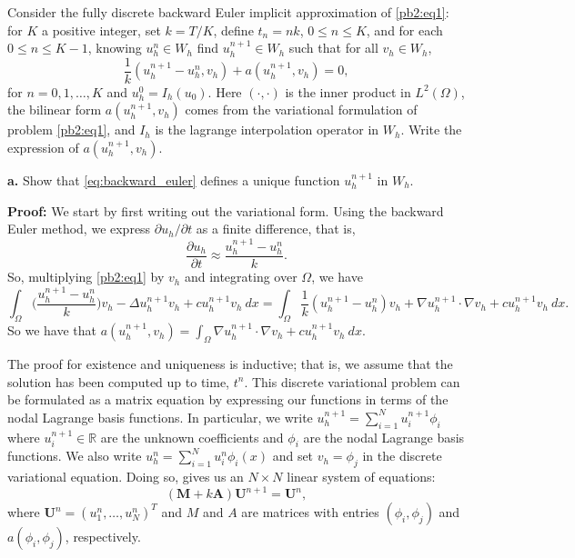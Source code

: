 \documentclass[11pt]{article}
\begin{document}
Consider the fully discrete backward Euler implicit approximation of \eqref{pb2:eq1}: for $K$ a positive integer, set $k = T/K$, define $t_n = nk$, $0 \leq n \leq K$, and for each $0 \leq n \leq K-1$, knowing $u_h^n \in W_h$ find $u_h^{n+1} \in W_h$ such that for all $v_h \in W_h$,
\begin{equation} \label{eq:backward_euler}
    \frac{1}{k}(u_h^{n+1} - u_h^n, v_h) + a(u_h^{n+1},v_h) = 0, 
\end{equation}
for $n = 0, 1, \ldots, K$ and $u_h^0 = I_h(u_0)$.
Here $(\cdot, \cdot)$ is the inner product in $L^2(\Omega)$, the bilinear form $a(u_h^{n+1}, v_h)$ comes from the variational formulation of problem \eqref{pb2:eq1}, and $I_h$ is the lagrange interpolation operator in $W_h$.
Write the expression of $a(u_h^{n+1}, v_h)$.

\vskip 1cm


\textbf{a.} Show that \eqref{eq:backward_euler} defines a unique function $u_h^{n+1}$ in $W_h$.

\vskip 1cm


\textbf{Proof:} We start by first writing out the variational form.
Using the backward Euler method, we express $\partial u_h/\partial t$ as a finite difference, that is,
\begin{equation}
    \frac{\partial u_h}{\partial t} \approx \frac{u_h^{n+1} - u_h^n}{k}.
\end{equation}
So, multiplying \eqref{pb2:eq1} by $v_h$ and integrating over $\Omega$, we have 
\begin{equation*}
    \int_\Omega \Big( \frac{u_h^{n+1} - u_h^n}{k} \Big) v_h  -\Delta u_h^{n+1} v_h + c u_h^{n+1} v_h \: dx = \int_\Omega \frac{1}{k}(u_h^{n+1} - u_h^n) v_h + \nabla u_h^{n+1} \cdot \nabla v_h + c u_h^{n+1} v_h \: dx.
\end{equation*}
So we have that $a(u_h^{n+1}, v_h) = \int_\Omega \nabla u_h^{n+1} \cdot \nabla v_h + c u_h^{n+1} v_h \: dx$.

The proof for existence and uniqueness is inductive; that is, we assume that the solution has been computed up to time, $t^n$.
This discrete variational problem can be formulated as a matrix equation by expressing our functions in terms of the nodal Lagrange basis functions.
In particular, we write $u_h^{n+1} = \sum_{i=1}^N u^{n+1}_i \phi_i$ where $u^{n+1}_i \in \mathbb{R}$ are the unknown coefficients and $\phi_i$ are the nodal Lagrange basis functions. 
We also write $u_h^n = \sum_{i=1}^N u_i^n \phi_i(x)$ and set $v_h = \phi_j$ in the discrete variational equation.
Doing so, gives us an $N \times N$ linear system of equations:
\begin{equation}
    (\mathbf{M}+k\mathbf{A})\mathbf{U}^{n+1} = \mathbf{U}^n,   
\end{equation}
where $\mathbf{U}^n = (u^n_1, \ldots, u^n_N)^T$ and $M$ and $A$ are matrices with entries $(\phi_i,\phi_j)$ and $a(\phi_i,\phi_j)$, respectively.  
\end{document}
